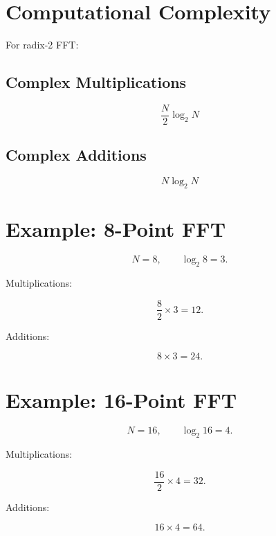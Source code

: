 
\section{Computational Complexity}

For radix-2 FFT:


\subsection{Complex Multiplications}

\[
\boxed{
\frac{N}{2}\log_2N
}
\]


\subsection{Complex Additions}

\[
\boxed{
N\log_2N
}
\]


\section{Example: 8-Point FFT}

\[
N=8,
\qquad
\log_2 8=3.
\]

Multiplications:

\[
\frac{8}{2}\times3=12.
\]

Additions:

\[
8\times3=24.
\]


\section{Example: 16-Point FFT}

\[
N=16,
\qquad
\log_2 16=4.
\]

Multiplications:

\[
\frac{16}{2}\times4=32.
\]

Additions:

\[
16\times4=64.
\]


